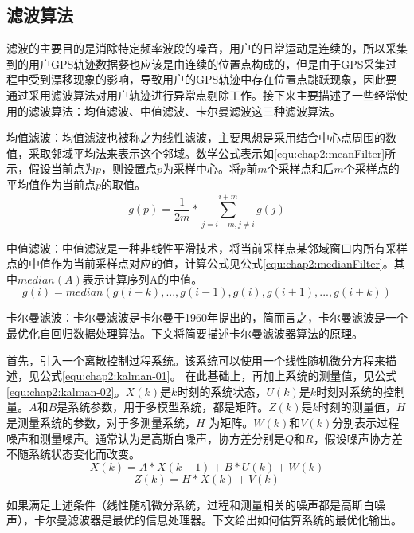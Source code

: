 \subsection{滤波算法}
\label{sec:section2-1-1}
滤波的主要目的是消除特定频率波段的噪音，用户的日常运动是连续的，所以采集到的用户GPS轨迹数据㛑也应该是由连续的位置点构成的，但是由于GPS采集过程中受到漂移现象的影响，导致用户的GPS轨迹中存在位置点跳跃现象，因此要通过采用滤波算法对用户轨迹进行异常点剔除工作。接下来主要描述了一些经常使用的滤波算法：均值滤波、中值滤波、卡尔曼滤波这三种滤波算法。
\par 均值滤波：均值滤波也被称之为线性滤波，主要思想是采用结合中心点周围的数值，采取邻域平均法来表示这个邻域。数学公式表示如\ref{equ:chap2:meanFilter}所示，假设当前点为$p$，则设置点$p$为采样中心。将$p$前$m$个采样点和后$m$个采样点的平均值作为当前点$p$的取值。
\begin{equation}
\label{equ:chap2:meanFilter}
g(p)=\frac{1}{2m} \ast \sum_{j=i-m,j\neq i}^{i+m}g(j)
\end{equation}
\par 中值滤波：中值滤波是一种非线性平滑技术，将当前采样点某邻域窗口内所有采样点的中值作为当前采样点对应的值，计算公式见公式\ref{equ:chap2:medianFilter}。其中$median(A)$表示计算序列A的中值。
\begin{equation}
\label{equ:chap2:medianFilter}
g(i)=median({g(i-k),...,g(i-1),g(i),g(i+1),...,g(i+k)})
\end{equation}
\par 卡尔曼滤波：卡尔曼滤波是卡尔曼于1960年提出的，简而言之，卡尔曼滤波是一个最优化自回归数据处理算法。下文将简要描述卡尔曼滤波器算法的原理。
\par 首先，引入一个离散控制过程系统。该系统可以使用一个线性随机微分方程来描述，见公式\ref{equ:chap2:kalman-01}。 在此基础上，再加上系统的测量值，见公式\ref{equ:chap2:kalman-02}。$X(k)$是$k$时刻的系统状态，$U(k)$是$k$时刻对系统的控制量。$A$和$B$是系统参数，用于多模型系统，都是矩阵。$Z(k)$是$k$时刻的测量值，$H$是测量系统的参数，对于多测量系统，$H$ 为矩阵。$W(k)$和$V(k)$分别表示过程噪声和测量噪声。通常认为是高斯白噪声，协方差分别是$Q$和$R$，假设噪声协方差不随系统状态变化而改变。
\begin{equation}
\label{equ:chap2:kalman-01}
X(k)=A \ast X(k-1)+B \ast U(k)+W(k)
\end{equation}
\begin{equation}
\label{equ:chap2:kalman-02}
Z(k)=H \ast X(k)+V(k)
\end{equation}
\par 如果满足上述条件（线性随机微分系统，过程和测量相关的噪声都是高斯白噪声），卡尔曼滤波器是最优的信息处理器。下文给出如何估算系统的最优化输出。
